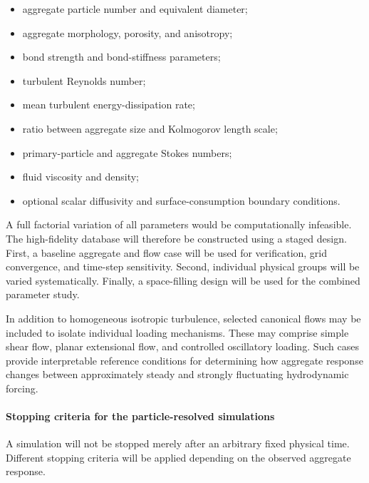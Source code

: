 \documentclass[11pt,a4paper,twoside]{scrartcl}
\begin{document}
\begin{itemize}
	\item aggregate particle number and equivalent diameter;
	
	\item aggregate morphology, porosity, and anisotropy;
	
	\item bond strength and bond-stiffness parameters;
	
	\item turbulent Reynolds number;
	
	\item mean turbulent energy-dissipation rate;
	
	\item ratio between aggregate size and Kolmogorov length scale;
	
	\item primary-particle and aggregate Stokes numbers;
	
	\item fluid viscosity and density;
	
	\item optional scalar diffusivity and surface-consumption boundary conditions.
\end{itemize}

A full factorial variation of all parameters would be computationally infeasible. The high-fidelity database will therefore be constructed using a staged design. First, a baseline aggregate and flow case will be used for verification, grid convergence, and time-step sensitivity. Second, individual physical groups will be varied systematically. Finally, a space-filling design will be used for the combined parameter study.

In addition to homogeneous isotropic turbulence, selected canonical flows may be included to isolate individual loading mechanisms. These may comprise simple shear flow, planar extensional flow, and controlled oscillatory loading. Such cases provide interpretable reference conditions for determining how aggregate response changes between approximately steady and strongly fluctuating hydrodynamic forcing.

\paragraph{Stopping criteria for the particle-resolved simulations}

A simulation will not be stopped merely after an arbitrary fixed physical time. Different stopping criteria will be applied depending on the observed aggregate response.
\end{document}
